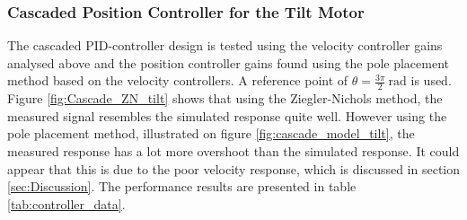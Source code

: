 \documentclass[../../main.tex]{subfiles}
\begin{document}
\subsubsection*{Cascaded Position Controller for the Tilt Motor}
The cascaded PID-controller design is tested using the velocity controller gains analysed above and the position controller gains found using the pole placement method based on the velocity controllers. A reference point of $\theta = \frac{3\pi}{2} \SI{}{\radian}$ is used. Figure \ref{fig:Cascade_ZN_tilt} shows that using the Ziegler-Nichols method, the measured signal resembles the simulated response quite well. However using the pole placement method, illustrated on figure \ref{fig:cascade_model_tilt}, the measured response has a lot more overshoot than the simulated response. It could appear that this is due to the poor velocity response, which is discussed in section \ref{sec:Discussion}. The performance results are presented in table \ref{tab:controller_data}.
\end{document}
